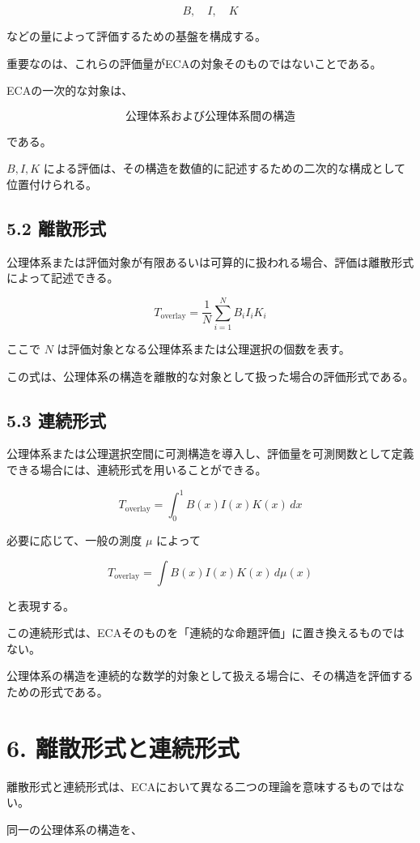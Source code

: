 \documentclass[12pt,a4paper]{article}
\begin{document}
\[
B,\quad I,\quad K
\]

などの量によって評価するための基盤を構成する。

重要なのは、これらの評価量がECAの対象そのものではないことである。

ECAの一次的な対象は、

\[
\boxed{\text{公理体系および公理体系間の構造}}
\]

である。

$B,I,K$ による評価は、その構造を数値的に記述するための二次的な構成として位置付けられる。

\subsection{5.2 離散形式}

公理体系または評価対象が有限あるいは可算的に扱われる場合、評価は離散形式によって記述できる。

\[
T_{\mathrm{overlay}}
=
\frac{1}{N}
\sum_{i=1}^{N} B_iI_iK_i
\]

ここで $N$ は評価対象となる公理体系または公理選択の個数を表す。

この式は、公理体系の構造を離散的な対象として扱った場合の評価形式である。

\subsection{5.3 連続形式}

公理体系または公理選択空間に可測構造を導入し、評価量を可測関数として定義できる場合には、連続形式を用いることができる。

\[
T_{\mathrm{overlay}}
=
\int_0^1 B(x)I(x)K(x)\,dx
\]

必要に応じて、一般の測度 $\mu$ によって

\[
T_{\mathrm{overlay}}
=
\int B(x)I(x)K(x)\,d\mu(x)
\]

と表現する。

この連続形式は、ECAそのものを「連続的な命題評価」に置き換えるものではない。

公理体系の構造を連続的な数学的対象として扱える場合に、その構造を評価するための形式である。

\section{6. 離散形式と連続形式}

離散形式と連続形式は、ECAにおいて異なる二つの理論を意味するものではない。

同一の公理体系の構造を、
\end{document}
